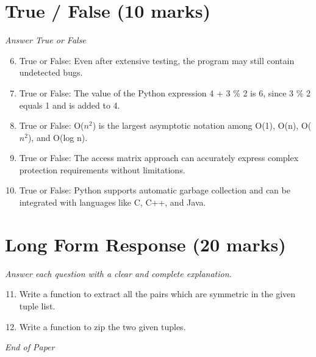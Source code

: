 \documentclass[12pt]{article}
\begin{document}
\section*{True / False (10 marks)}
\textit{Answer True or False}
\begin{enumerate}[label=\arabic*.]
\setcounter{enumi}{5}
\item True or False: Even after extensive testing, the program may still contain undetected bugs.
\item True or False: The value of the Python expression 4 + 3 \% 2 is 6, since 3 \% 2 equals 1 and is added to 4.
\item True or False: O($n^2$) is the largest asymptotic notation among O(1), O(n), O($n^2$), and O(log n).
\item True or False: The access matrix approach can accurately express complex protection requirements without limitations.
\item True or False: Python supports automatic garbage collection and can be integrated with languages like C, C++, and Java.
\end{enumerate}

\section*{Long Form Response (20 marks)}
\textit{Answer each question with a clear and complete explanation.}
\begin{enumerate}[label=\arabic*.]
\setcounter{enumi}{10}
\item Write a function to extract all the pairs which are symmetric in the given tuple list.
\item Write a function to zip the two given tuples.
\end{enumerate}

\vfill
\noindent\textit{End of Paper}
\end{document}
